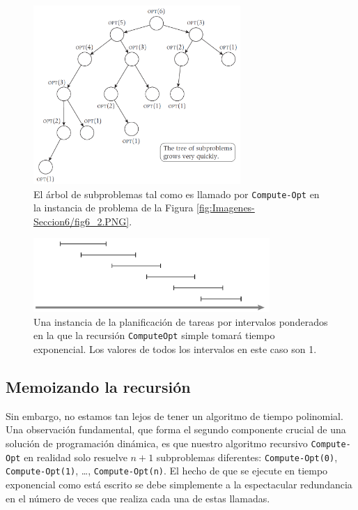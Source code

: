 \documentclass[a4paper, 12pt]{book}
\theoremstyle{dotless}
\begin{document}
\begin{figure}[h]
\centering
\includegraphics[width=0.7\textwidth]{Imagenes-Seccion6/fig6_3.PNG}
\caption{El árbol de subproblemas tal como es llamado por \texttt{Compute-Opt} en la instancia de problema de la Figura \ref{fig:Imagenes-Seccion6/fig6_2.PNG}.}
\label{fig:Imagenes-Seccion6/fig6_3.PNG}
\end{figure}

\begin{figure}[h]
\centering
\includegraphics[width=0.8\textwidth]{Imagenes-Seccion6/fig6_4.PNG}
\caption{Una instancia de la planificación de tareas por intervalos ponderados en la que la recursión \texttt{ComputeOpt} simple tomará tiempo exponencial. Los valores de todos los intervalos en este caso son 1.}
\label{fig:Imagenes-Seccion6/fig6_4.PNG}
\end{figure}

\subsection*{Memoizando la recursión}

Sin embargo, no estamos tan lejos de tener un algoritmo de tiempo polinomial. Una observación fundamental, que forma el segundo componente crucial de una solución de programación dinámica, es que nuestro algoritmo recursivo \texttt{Compute-Opt} en realidad solo resuelve $n + 1$ subproblemas diferentes: \texttt{Compute-Opt(0)}, \texttt{Compute-Opt(1)}, \dots, \texttt{Compute-Opt(n)}. El hecho de que se ejecute en tiempo exponencial como está escrito se debe simplemente a la espectacular redundancia en el número de veces que realiza cada una de estas llamadas.
\end{document}

